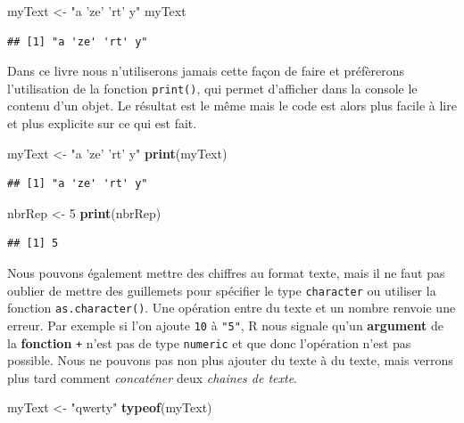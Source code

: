 \documentclass[]{book}
\newenvironment{Shaded}{\begin{snugshade}}{\end{snugshade}}
\newcommand{\DecValTok}[1]{\textcolor[rgb]{0.00,0.00,0.81}{#1}}
\newcommand{\KeywordTok}[1]{\textcolor[rgb]{0.13,0.29,0.53}{\textbf{#1}}}
\newcommand{\NormalTok}[1]{#1}
\newcommand{\StringTok}[1]{\textcolor[rgb]{0.31,0.60,0.02}{#1}}
\begin{document}
\begin{Shaded}
\begin{Highlighting}[]
\NormalTok{myText <-}\StringTok{ "a 'ze' 'rt' y"}
\NormalTok{myText}
\end{Highlighting}
\end{Shaded}

\begin{verbatim}
## [1] "a 'ze' 'rt' y"
\end{verbatim}

Dans ce livre nous n'utiliserons jamais cette façon de faire et préfèrerons l'utilisation de la fonction \texttt{print()}, qui permet d'afficher dans la console le contenu d'un objet. Le résultat est le même mais le code est alors plus facile à lire et plus explicite sur ce qui est fait.

\begin{Shaded}
\begin{Highlighting}[]
\NormalTok{myText <-}\StringTok{ "a 'ze' 'rt' y"}
\KeywordTok{print}\NormalTok{(myText)}
\end{Highlighting}
\end{Shaded}

\begin{verbatim}
## [1] "a 'ze' 'rt' y"
\end{verbatim}

\begin{Shaded}
\begin{Highlighting}[]
\NormalTok{nbrRep <-}\StringTok{ }\DecValTok{5}
\KeywordTok{print}\NormalTok{(nbrRep)}
\end{Highlighting}
\end{Shaded}

\begin{verbatim}
## [1] 5
\end{verbatim}

Nous pouvons également mettre des chiffres au format texte, mais il ne faut pas oublier de mettre des guillemets pour spécifier le type \texttt{character} ou utiliser la fonction \texttt{as.character()}. Une opération entre du texte et un nombre renvoie une erreur. Par exemple si l'on ajoute \texttt{10} à \texttt{"5"}, R nous signale qu'un \textbf{argument} de la \textbf{fonction} \texttt{+} n'est pas de type \texttt{numeric} et que donc l'opération n'est pas possible. Nous ne pouvons pas non plus ajouter du texte à du texte, mais verrons plus tard comment \emph{concaténer} deux \emph{chaines de texte}.

\begin{Shaded}
\begin{Highlighting}[]
\NormalTok{myText <-}\StringTok{ "qwerty"}
\KeywordTok{typeof}\NormalTok{(myText)}
\end{Highlighting}
\end{Shaded}
\end{document}
